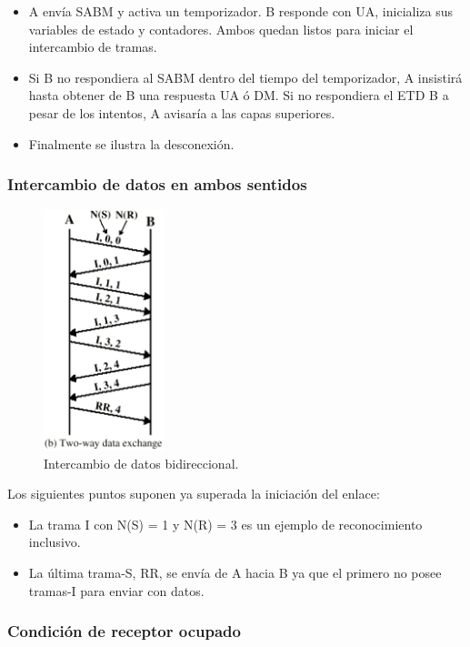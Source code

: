\documentclass[withindex,glossary]{cam-thesis}
\begin{document}
\begin{itemize}
	\item A envía SABM y activa un temporizador. B responde con UA, inicializa sus variables de estado y contadores. Ambos quedan listos para iniciar el intercambio de tramas.
	\item Si B no respondiera al SABM dentro del tiempo del temporizador, A insistirá hasta obtener de B una respuesta UA ó DM. Si no respondiera el ETD B a pesar de los intentos, A avisaría a las capas superiores.
	\item Finalmente se ilustra la desconexión.
\end{itemize}

\subsubsection{Intercambio de datos en ambos sentidos}

\begin{figure}[H]
\centering
\includegraphics[height=7.0cm]{images/HDLC_TwoWay}
\caption[Intercambio de datos bidireccional]{Intercambio de datos bidireccional.}
\end{figure}

Los siguientes puntos suponen ya superada la iniciación del enlace:
\begin{itemize}
	\item La trama I con N(S) = 1 y N(R) = 3 es un ejemplo de reconocimiento inclusivo.
	\item La última trama-S, RR, se envía de A hacia B ya que el primero no posee tramas-I para enviar con datos.
\end{itemize}

\subsubsection{Condición de receptor ocupado}
\end{document}
